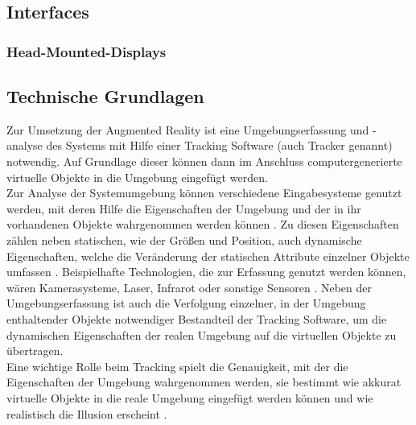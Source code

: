 \subsection{Interfaces}
\subsubsection{Head-Mounted-Displays}\label{sec:HMD}

\subsection{Technische Grundlagen}
Zur Umsetzung der Augmented Reality ist eine Umgebungserfassung und -analyse des Systems mit Hilfe einer Tracking Software (auch Tracker genannt) notwendig. Auf Grundlage dieser können dann im Anschluss computergenerierte virtuelle Objekte in die Umgebung eingefügt werden. \\
Zur Analyse der Systemumgebung können verschiedene Eingabesysteme genutzt werden, mit deren Hilfe die Eigenschaften der Umgebung und der in ihr vorhandenen Objekte wahrgenommen werden können \citep[S. 22]{tab:augmented-reality}. Zu diesen Eigenschaften zählen neben statischen, wie der Größen und Position, auch dynamische Eigenschaften, welche die Veränderung der statischen Attribute einzelner Objekte umfassen . Beispielhafte Technologien, die zur Erfassung genutzt werden können, wären Kamerasysteme, Laser, Infrarot oder sonstige Sensoren \citep[S. 22]{tab:augmented-reality}.
Neben der Umgebungserfassung ist auch die Verfolgung einzelner, in der Umgebung enthaltender Objekte notwendiger Bestandteil der Tracking Software, um die dynamischen Eigenschaften der realen Umgebung auf die virtuellen Objekte zu übertragen.\\
Eine wichtige Rolle beim Tracking spielt die Genauigkeit, mit der die Eigenschaften der Umgebung wahrgenommen werden, sie bestimmt wie akkurat virtuelle Objekte in die reale Umgebung eingefügt werden können und wie realistisch die Illusion erscheint \citep[S. 2]{klein:visual-tracking}.

